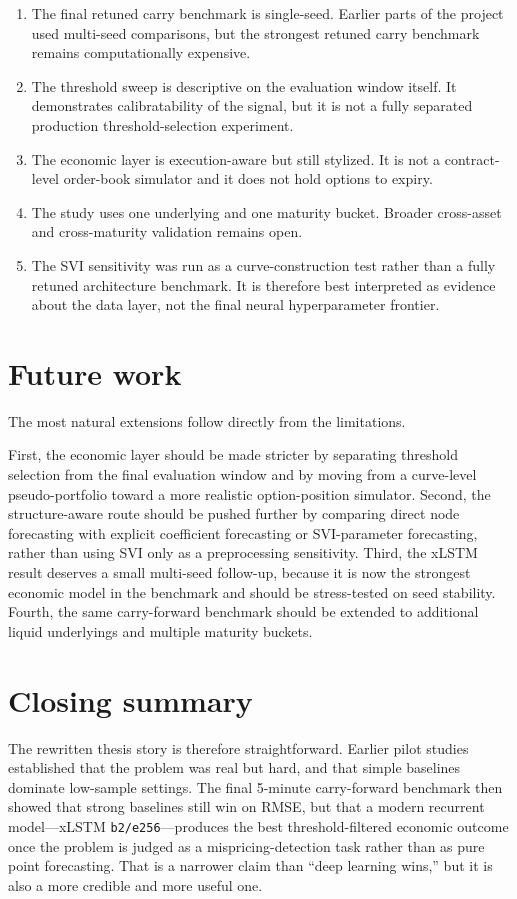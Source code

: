 \documentclass[12pt]{report}
\newcommand{\code}[1]{\texttt{#1}}
\begin{document}
\begin{enumerate}[leftmargin=1.3cm]
    \item The final retuned carry benchmark is single-seed. Earlier parts of the project used multi-seed comparisons, but the strongest retuned carry benchmark remains computationally expensive.
    \item The threshold sweep is descriptive on the evaluation window itself. It demonstrates calibratability of the signal, but it is not a fully separated production threshold-selection experiment.
    \item The economic layer is execution-aware but still stylized. It is not a contract-level order-book simulator and it does not hold options to expiry.
    \item The study uses one underlying and one maturity bucket. Broader cross-asset and cross-maturity validation remains open.
    \item The SVI sensitivity was run as a curve-construction test rather than a fully retuned architecture benchmark. It is therefore best interpreted as evidence about the data layer, not the final neural hyperparameter frontier.
\end{enumerate}

\section{Future work}
The most natural extensions follow directly from the limitations.

First, the economic layer should be made stricter by separating threshold selection from the final evaluation window and by moving from a curve-level pseudo-portfolio toward a more realistic option-position simulator. Second, the structure-aware route should be pushed further by comparing direct node forecasting with explicit coefficient forecasting or SVI-parameter forecasting, rather than using SVI only as a preprocessing sensitivity. Third, the xLSTM result deserves a small multi-seed follow-up, because it is now the strongest economic model in the benchmark and should be stress-tested on seed stability. Fourth, the same carry-forward benchmark should be extended to additional liquid underlyings and multiple maturity buckets.

\section*{Closing summary}
The rewritten thesis story is therefore straightforward. Earlier pilot studies established that the problem was real but hard, and that simple baselines dominate low-sample settings. The final 5-minute carry-forward benchmark then showed that strong baselines still win on RMSE, but that a modern recurrent model---xLSTM \code{b2/e256}---produces the best threshold-filtered economic outcome once the problem is judged as a mispricing-detection task rather than as pure point forecasting. That is a narrower claim than ``deep learning wins,'' but it is also a more credible and more useful one.
\end{document}
